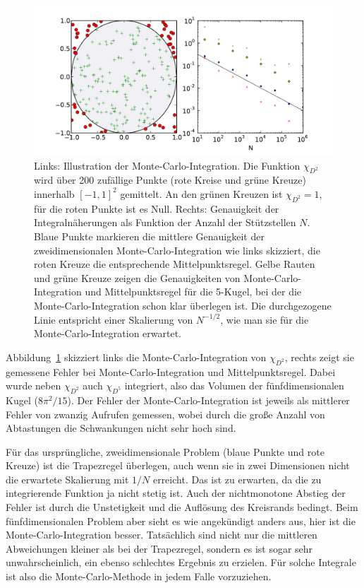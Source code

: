 \begin{figure}
  \centering
  \includegraphics[width=\textwidth]{plots/pi}
  \caption{Links: Illustration der Monte-Carlo-Integration. Die
    Funktion $\chi_{D^2}$ wird über 200 zufällige Punkte (rote Kreise
    und grüne Kreuze) innerhalb $[-1,1]^2$ gemittelt. An den grünen
    Kreuzen ist $\chi_{D^2}=1$, für die roten Punkte ist es
    Null. Rechts: Genauigkeit der Integralnäherungen als Funktion der
    Anzahl der Stützstellen $N$.  Blaue Punkte markieren die mittlere
    Genauigkeit der zweidimensionalen Monte-Carlo-Integration wie
    links skizziert, die roten Kreuze die entsprechende
    Mittelpunktsregel. Gelbe Rauten und grüne Kreuze zeigen die
    Genauigkeiten von Monte-Carlo-Integration und Mittelpunktsregel
    für die 5-Kugel, bei der die Monte-Carlo-Integration schon klar
    überlegen ist. Die durchgezogene Linie entspricht einer Skalierung
    von $N^{-1/2}$, wie man sie für die Monte-Carlo-Integration
    erwartet.}
  \label{fig:pi}
\end{figure}

Abbildung~\ref{fig:pi} skizziert links die Monte-Carlo-Integration von
$\chi_{D^2}$, rechts zeigt sie gemessene Fehler bei
Monte-Carlo-Integration und Mittelpunktsregel. Dabei wurde neben
$\chi_{D^2}$ auch $\chi_{D^5}$ integriert, also das Volumen der
fünfdimensionalen Kugel ($8\pi^2/15$). Der Fehler der
Monte-Carlo-Integration ist jeweils als mittlerer Fehler von zwanzig
Aufrufen gemessen, wobei durch die große Anzahl von Abtastungen die
Schwankungen nicht sehr hoch sind.

Für das ursprüngliche, zweidimensionale Problem (blaue Punkte und rote
Kreuze) ist die Trapezregel überlegen, auch wenn sie in zwei
Dimensionen nicht die erwartete Skalierung mit $1/N$ erreicht. Das ist
zu erwarten, da die zu integrierende Funktion ja nicht stetig
ist. Auch der nichtmonotone Abstieg der Fehler ist durch die
Unstetigkeit und die Auflösung des Kreisrands bedingt. Beim
fünfdimensionalen Problem aber sieht es wie angekündigt anders aus,
hier ist die Monte-Carlo-Integration besser. Tatsächlich sind nicht
nur die mittleren Abweichungen kleiner als bei der Trapezregel,
sondern es ist sogar sehr unwahrscheinlich, ein ebenso schlechtes
Ergebnis zu erzielen. Für solche Integrale ist also die
Monte-Carlo-Methode in jedem Falle vorzuziehen.

